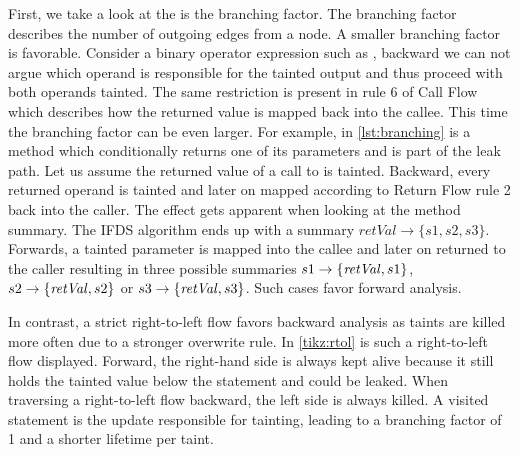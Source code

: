 \documentclass[../draft.tex]{subfiles}
\begin{document}
    First, we take a look at the is the branching factor. The branching factor describes the number of outgoing edges from a node. A smaller branching factor is favorable.   
    Consider a binary operator expression such as , backward we can not argue which operand is responsible for the tainted output and thus proceed with both operands tainted.
    The same restriction is present in rule 6 of Call Flow which describes how the returned value is mapped back into the callee.
    This time the branching factor can be even larger.
    For example, in \autoref{lst:branching} is a method which conditionally returns one of its parameters and is part of the leak path.
    Let us assume the returned value of a call to  is tainted. Backward, every returned operand is tainted and later on mapped according to Return Flow rule 2 back into the caller.
    The effect gets apparent when looking at the method summary.
    The IFDS algorithm ends up with a summary $\mathit{retVal} \rightarrow \{s1, s2, s3\}$. 
    Forwards, a tainted parameter is mapped into the callee and later on returned to the caller resulting in three possible summaries  $s1 \rightarrow \mathit\{\mathit{retVal}, s1\}$, $s2 \rightarrow \mathit\{\mathit{retVal}, s2\}$ or $s3 \rightarrow \mathit\{\mathit{retVal}, s3\}$.
    Such cases favor forward analysis.

    In contrast, a strict right-to-left flow favors backward analysis as taints are killed more often due to a stronger overwrite rule. 
    In \autoref{tikz:rtol} is such a right-to-left flow displayed. 
    Forward, the right-hand side is always kept alive because it still holds the tainted value below the statement and could be leaked. 
    When traversing a right-to-left flow backward, the left side is always killed. 
    A visited statement is the update responsible for tainting, leading to a branching factor of 1 and a shorter lifetime per taint. 
\end{document}
